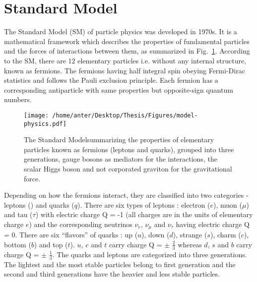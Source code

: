 \section{Standard Model}
The Standard Model (SM) of particle physics \cite{Perkins:1982xb,Herrero:1998eq,Weinberg:1967tq} was developed in 1970s. It is a mathematical framework which describes the properties of fundamental particles and the forces of interactions between them, as summarized in Fig.~\ref{fig:SM}. According to the SM, there are 12 elementary particles i.e. without any internal structure, known as fermions. The fermions having half integral spin obeying Fermi-Dirac statistics and follows the Pauli exclusion principle. Each fermion has a corresponding antiparticle with same properties but opposite-sign quantum numbers.
\begin{figure}[!h]
\begin{center}
\hspace*{-15mm}
\texttt{[image: /home/anter/Desktop/Thesis/Figures/model-physics.pdf]}\\
\caption[The Standard Model summarizing the properties of elementary particles and their forces of interaction.]{The Standard Model\footnotemark summarizing the properties of elementary particles known as fermions (leptons and quarks), grouped into three generations, gauge bosons as mediators for the interactions, the scalar Higgs boson and not corporated graviton for the gravitational force.}
\label{fig:SM}
\end{center}
\end{figure}
Depending on how the fermions interact, they are classified into two categories - leptons (\sln) and quarks ($q$). There are six types of leptons : electron ($e$), muon ($\mu$) and tau ($\tau$) with electric charge Q = -1 (all charges are in the units of elementary charge $e$) and the corresponding neutrinos $\nu_e$, $\nu_\mu$ and $\nu_\tau$ having electric charge Q = 0. There are six ``flavors'' of quarks : up ($u$), down ($d$), strange ($s$), charm ($c$), bottom ($b$) and top ($t$). $u$, $c$ and $t$ carry charge Q = $\pm$ $\frac{2}{3}$ whereas $d$, $s$ and $b$ carry charge Q = $\pm$ $\frac{1}{3}$. The quarks and leptons are categorized into three generations. The lightest and the most stable particles belong to first generation and the second and third generations have the heavier and less stable particles.

